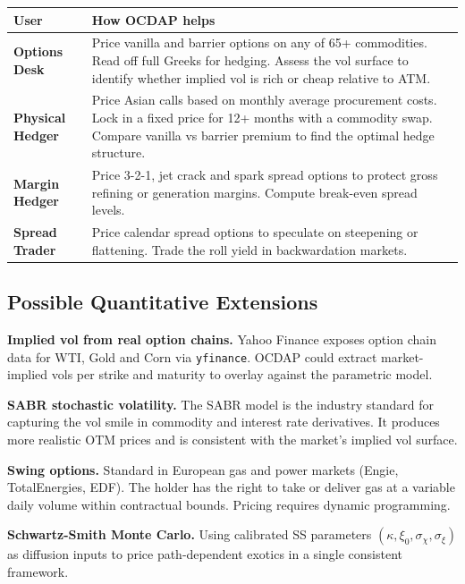 \documentclass[11pt,a4paper]{article}
\renewcommand{\arraystretch}{1}
\renewcommand{\arraystretch}{1}
\renewcommand{\arraystretch}{1.45}
\begin{document}
\begin{center}
\renewcommand{\arraystretch}{1.8}
\begin{tabularx}{\textwidth}{>{\bfseries}l X}
\toprule
User & How OCDAP helps \\
\midrule
Options Desk &
  Price vanilla and barrier options on any of 65+ commodities.
  Read off full Greeks for hedging. Assess the vol surface to identify
  whether implied vol is rich or cheap relative to ATM. \\
Physical Hedger &
  Price Asian calls based on monthly average procurement costs.
  Lock in a fixed price for 12+ months with a commodity swap.
  Compare vanilla vs barrier premium to find the optimal hedge structure. \\
Margin Hedger &
  Price 3-2-1, jet crack and spark spread options to protect gross
  refining or generation margins. Compute break-even spread levels. \\
Spread Trader &
  Price calendar spread options to speculate on steepening or flattening.
  Trade the roll yield in backwardation markets. \\
\bottomrule
\end{tabularx}
\end{center}

\subsection{Possible Quantitative Extensions}

\textbf{Implied vol from real option chains.}
Yahoo Finance exposes option chain data for WTI, Gold and Corn via
\texttt{yfinance}. OCDAP could extract market-implied vols per strike and
maturity to overlay against the parametric model.

\textbf{SABR stochastic volatility.}
The SABR model is the industry standard for capturing the vol smile in
commodity and interest rate derivatives. It produces more realistic OTM prices
and is consistent with the market's implied vol surface.

\textbf{Swing options.}
Standard in European gas and power markets (Engie, TotalEnergies, EDF).
The holder has the right to take or deliver gas at a variable daily volume
within contractual bounds. Pricing requires dynamic programming.

\textbf{Schwartz-Smith Monte Carlo.}
Using calibrated SS parameters $(\kappa,\xi_0,\sigma_\chi,\sigma_\xi)$ as
diffusion inputs to price path-dependent exotics in a single consistent framework.
\end{document}
